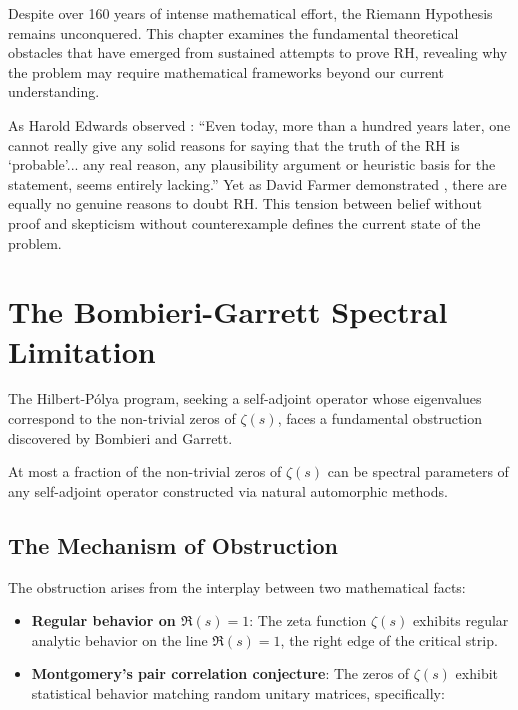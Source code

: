 \label{ch:obstructions}

Despite over 160 years of intense mathematical effort, the Riemann Hypothesis remains unconquered. This chapter examines the fundamental theoretical obstacles that have emerged from sustained attempts to prove RH, revealing why the problem may require mathematical frameworks beyond our current understanding.

As Harold Edwards observed \cite{edwards1974}: ``Even today, more than a hundred years later, one cannot really give any solid reasons for saying that the truth of the RH is `probable'... any real reason, any plausibility argument or heuristic basis for the statement, seems entirely lacking.'' Yet as David Farmer demonstrated \cite{farmer2022}, there are equally no genuine reasons to doubt RH. This tension between belief without proof and skepticism without counterexample defines the current state of the problem.

\section{The Bombieri-Garrett Spectral Limitation}
\label{sec:bombieri_garrett}

The Hilbert-P\'olya program, seeking a self-adjoint operator whose eigenvalues correspond to the non-trivial zeros of $\zeta(s)$, faces a fundamental obstruction discovered by Bombieri and Garrett.

\begin{theorem}
\label{thm:bombieri_garrett}
At most a fraction of the non-trivial zeros of $\zeta(s)$ can be spectral parameters of any self-adjoint operator constructed via natural automorphic methods.
\end{theorem}

\subsection{The Mechanism of Obstruction}

The obstruction arises from the interplay between two mathematical facts:

\begin{itemize}
\item \textbf{Regular behavior on $\Re(s) = 1$}: The zeta function $\zeta(s)$ exhibits regular analytic behavior on the line $\Re(s) = 1$, the right edge of the critical strip.
\item \textbf{Montgomery's pair correlation conjecture}: The zeros of $\zeta(s)$ exhibit statistical behavior matching random unitary matrices, specifically:
\end{itemize}

